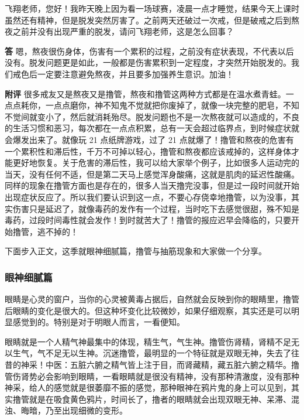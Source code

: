 \begin{case}
    飞翔老师，您好！我昨天晚上因为看一场球赛，凌晨一点才睡觉，结果今天上课时虽然还有精神，但是脱发突然厉害了。之前两天还破过一次戒，但是破戒之后到熬夜之前并没有出现严重的脱发，请问飞翔老师，这是怎么回事？

    \textbf{答} 嗯，熬夜很伤身体，伤害有一个累积的过程，之前没有症状表现，不代表以后没有。脱发问题更是如此，一般都是伤害累积到一定程度，才突然开始脱发的。我们戒色后一定要注意避免熬夜，并且要多加强养生意识。加油！

    \textbf{附评} 很多戒友又是熬夜又是撸管，熬夜和撸管这两种方式都是在温水煮青蛙。一点点耗你，一点点磨你，神不知鬼不觉就把你废掉了，就像一块完整的肥皂，不知不觉间就变小了，然后就消耗殆尽。脱发问题也不是一次熬夜就可以造成的，不良的生活习惯和恶习，每次都在一点点积累，总有一天会超过临界点，到时候症状就会爆发出来了。就像玩 21 点纸牌游戏，过了 21 点就爆了！撸管和熬夜的危害有一个累积性和滞后性，千万不可掉以轻心，撸管和熬夜都应该戒掉的，这样身体才能更好地恢复。关于危害的滞后性，我可以给大家举个例子，比如很多人运动完的当天，没有任何不适，但是第二天马上感觉浑身酸痛，这就是肌肉的延迟性酸痛。同样的现象在撸管方面也是存在的，很多人当天撸完没事，但是过一段时间就开始出现症状反应了。所以我们要认识到这一点，不要心存侥幸地撸管，以为没事，其实伤害只是延迟了，就像毒药的发作有一个过程，当时吃下去感觉很甜，殊不知是毒药，过段时间毒性就会发作！到时就苦大了！撸管的报应迟早会降临的，只要开始撸管，逃不掉的！
\end{case}

下面步入正文，这季就眼神细腻篇，撸管与抽筋现象和大家做一个分享。

\subsubsection{眼神细腻篇}

眼睛是心灵的窗户，当你的心灵被黄毒占据后，自然就会反映到你的眼睛里，撸管后眼睛的变化是很大的。但这种坏变化比较微妙，如果仔细观察，其实还是可以明显感觉到的。特别是对于明眼人而言，一看便知。

眼睛就是一个人精气神最集中的体现，精生气，气生神。撸管伤肾精，肾精不足无以生气，气不足无以生神。沉迷撸管，最明显的一个特征就是双眼无神，失去了往昔的神采！中医：五脏六腑之精气皆上注于目，而肾藏精，藏五脏六腑之精华。撸管伤肾势必会影响到眼睛，一看眼睛就是很没有精神，没有那种清澈度，没有那种神采，给人的感觉就是很萎靡不振的感觉，那种眼神在鸦片鬼的身上可以见到，其实撸管就是在吸食黄色鸦片，时间长了，撸者的眼睛就会出现双眼无神、呆滞、混浊、晦暗，乃至出现细微的变形。

